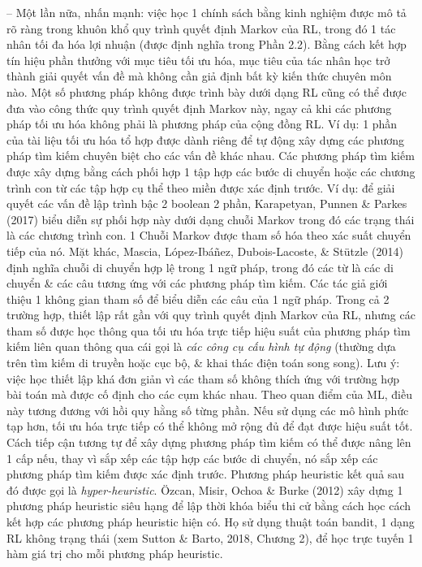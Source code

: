 \documentclass{article}
\begin{document}
\begin{itemize}
\begin{itemize}
\begin{itemize}
            -- Một lần nữa, nhấn mạnh: việc học 1 chính sách bằng kinh nghiệm được mô tả rõ ràng trong khuôn khổ quy trình quyết định Markov của RL, trong đó 1 tác nhân tối đa hóa lợi nhuận (được định nghĩa trong Phần 2.2). Bằng cách kết hợp tín hiệu phần thưởng với mục tiêu tối ưu hóa, mục tiêu của tác nhân học trở thành giải quyết vấn đề mà không cần giả định bất kỳ kiến thức chuyên môn nào. Một số phương pháp không được trình bày dưới dạng RL cũng có thể được đưa vào công thức quy trình quyết định Markov này, ngay cả khi các phương pháp tối ưu hóa không phải là phương pháp của cộng đồng RL. Ví dụ: 1 phần của tài liệu tối ưu hóa tổ hợp được dành riêng để tự động xây dựng các phương pháp tìm kiếm chuyên biệt cho các vấn đề khác nhau. Các phương pháp tìm kiếm được xây dựng bằng cách phối hợp 1 tập hợp các bước di chuyển hoặc các chương trình con từ các tập hợp cụ thể theo miền được xác định trước. Ví dụ: để giải quyết các vấn đề lập trình bậc 2 boolean 2 phần, Karapetyan, Punnen \& Parkes (2017) biểu diễn sự phối hợp này dưới dạng chuỗi Markov trong đó các trạng thái là các chương trình con. 1 Chuỗi Markov được tham số hóa theo xác suất chuyển tiếp của nó. Mặt khác, Mascia, López-Ibáñez, Dubois-Lacoste, \& Stützle (2014) định nghĩa chuỗi di chuyển hợp lệ trong 1 ngữ pháp, trong đó các từ là các di chuyển \& các câu tương ứng với các phương pháp tìm kiếm. Các tác giả giới thiệu 1 không gian tham số để biểu diễn các câu của 1 ngữ pháp. Trong cả 2 trường hợp, thiết lập rất gần với quy trình quyết định Markov của RL, nhưng các tham số được học thông qua tối ưu hóa trực tiếp hiệu suất của phương pháp tìm kiếm liên quan thông qua cái gọi là {\it các công cụ cấu hình tự động} (thường dựa trên tìm kiếm di truyền hoặc cục bộ, \& khai thác điện toán song song). Lưu ý: việc học thiết lập khá đơn giản vì các tham số không thích ứng với trường hợp bài toán mà được cố định cho các cụm khác nhau. Theo quan điểm của ML, điều này tương đương với hồi quy hằng số từng phần. Nếu sử dụng các mô hình phức tạp hơn, tối ưu hóa trực tiếp có thể không mở rộng đủ để đạt được hiệu suất tốt. Cách tiếp cận tương tự để xây dựng phương pháp tìm kiếm có thể được nâng lên 1 cấp nếu, thay vì sắp xếp các tập hợp các bước di chuyển, nó sắp xếp các phương pháp tìm kiếm được xác định trước. Phương pháp heuristic kết quả sau đó được gọi là {\it hyper-heuristic}. Özcan, Misir, Ochoa \& Burke (2012) xây dựng 1 phương pháp heuristic siêu hạng để lập thời khóa biểu thi cử bằng cách học cách kết hợp các phương pháp heuristic hiện có. Họ sử dụng thuật toán bandit, 1 dạng RL không trạng thái (xem Sutton \& Barto, 2018, Chương 2), để học trực tuyến 1 hàm giá trị cho mỗi phương pháp heuristic.


\end{itemize}
\end{itemize}
\end{itemize}
\end{document}
